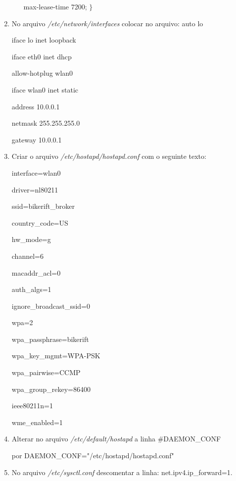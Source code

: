 \begin{enumerate}
\begin{itemize}
                \hspace*{6mm}    max-lease-time 7200;
                $\}$
        \end{itemize}
    \item No arquivo \textit{/etc/network/interfaces} colocar no arquivo:
        auto lo

        iface lo inet loopback

        iface eth0 inet dhcp

        allow-hotplug wlan0

        iface wlan0 inet static

            \hspace*{6mm} address 10.0.0.1

            \hspace*{6mm} netmask 255.255.255.0

	    \hspace*{6mm} gateway 10.0.0.1

    \item Criar o arquivo \textit{/etc/hostapd/hostapd.conf} com o seguinte texto:

        interface=wlan0

        driver=nl80211

        ssid=bikerift\_broker

        country\_code=US

        hw\_mode=g

        channel=6

        macaddr\_acl=0

        auth\_algs=1

        ignore\_broadcast\_ssid=0

        wpa=2

        wpa\_passphrase=bikerift

        wpa\_key\_mgmt=WPA-PSK

        wpa\_pairwise=CCMP

        wpa\_group\_rekey=86400

        ieee80211n=1

        wme\_enabled=1

    \item Alterar no arquivo \textit{/etc/default/hostapd} a linha \#DAEMON\_CONF

por DAEMON\_CONF="/etc/hostapd/hostapd.conf"

    \item No arquivo \textit{/etc/sysctl.conf} descomentar a linha: net.ipv4.ip\_forward=1.


\end{enumerate}
